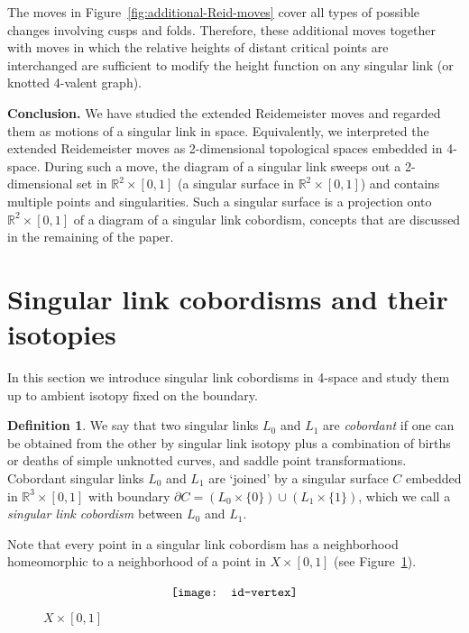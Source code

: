 \documentclass{amsart}\usepackage{amsfonts, amsmath, amssymb}\usepackage{graphicx, epic, epsf, enumerate, stmaryrd}
\theoremstyle{definition}
\newtheorem{definition}{Definition}
\numberwithin{equation}{section}
\begin{document}
The moves in Figure~\ref{fig:additional-Reid-moves} cover all types of possible changes involving cusps and folds. Therefore, these additional moves together with moves in which the relative heights of distant critical points are interchanged are sufficient to modify the height function on any singular link (or knotted 4-valent graph).

\textbf{Conclusion.} We have studied the extended Reidemeister moves and regarded them as motions of a singular link in space. Equivalently, we interpreted the extended Reidemeister moves as 2-dimensional topological spaces embedded in 4-space. During such a move, the diagram of a singular link sweeps out a 2-dimensional set in $\mathbb{R}^2 \times [0, 1]$ (a singular surface in $\mathbb{R}^2 \times [0, 1]$) and contains multiple points and singularities. Such a singular surface is a projection onto $\mathbb{R}^2 \times [0, 1]$ of a diagram of a singular link cobordism, concepts that are discussed in the remaining of the paper.

\section{Singular link cobordisms and their isotopies}\label{sec:cobordisms}

In this section we introduce singular link cobordisms in 4-space and study them up to ambient isotopy fixed on the boundary. 

\begin{definition}
We say that two singular links $L_0$ and $L_1$ are \textit{cobordant} if one can be obtained from the other by singular link isotopy plus a combination of births or deaths of simple unknotted curves, and saddle point transformations. Cobordant singular links $L_0$ and $L_1$ are `joined' by a singular surface $C$ embedded in ${\mathbb{R}}^3 \times [0,1]$ with boundary $\partial C = (L_0 \times \{0\}) \cup (L_1 \times \{1\})$, which we call a \textit{singular link cobordism} between $L_0$ and $L_1$.
\end{definition}

Note that every point in a singular link cobordism has a neighborhood homeomorphic to a neighborhood of a point in $X \times [0, 1]$ (see Figure~\ref{fig:id-vertex}). 

\begin{figure}[ht]
\[\raisebox{-10pt}{\texttt{[image: id-vertex]}}\]
\caption{$X \times [0, 1]$}\label{fig:id-vertex}
\end{figure}
\end{document}
